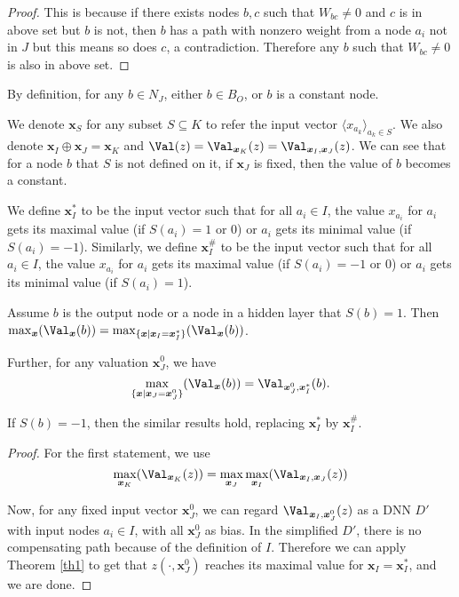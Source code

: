 				\begin{proof}
					This is because if there exists nodes $b,c$ such that $W_{bc}\neq 0$ and $c$ is in above set but $b$ is not, then $b$ has a path with nonzero weight from a node $a_i$ not in $J$ but this means so does $c$, a contradiction. Therefore any $b$ such that $W_{bc}\neq 0$ is also in above set.
				\end{proof}
				
				By definition, for any $b\in N_J$, either $b\in B_O$, or $b$ is a constant node.
				
				We denote $\boldsymbol{x}_S$ for any subset $S\subseteq K$ to refer the input vector $\langle x_{a_k}\rangle_{a_k\in S}$. We also denote $\boldsymbol{x}_I\oplus \boldsymbol{x}_J = \boldsymbol{x}_K$ and $\Val(z)=\Val_{\boldsymbol{x}_K}(z)=\Val_{\boldsymbol{x}_I,\boldsymbol{x}_J} (z)$. We can see that for a node $b$ that $S$ is not defined on it, if $\boldsymbol{x}_J$ is fixed, then the value of $b$ becomes a constant.
				
				We define $\boldsymbol{x}_I^*$ to be the input vector such that for all $a_i \in I$, the value $x_{a_i}$ for $a_i$ gets its maximal value (if $S(a_i)=1$ or $0$) or $a_i$ gets its minimal value (if $S(a_i)=-1$). Similarly, we define $\boldsymbol{x}_I^\#$ to be the input vector such that for all $a_i \in I$, the value $x_{a_i}$ for $a_i$ gets its maximal value (if $S(a_i)=-1$ or $0$) or $a_i$ gets its minimal value (if $S(a_i)=1$).
				
				
				
				\begin{lemma} \label{lem:reach_max_2}
					
					Assume $b$ is the output node or a node in a hidden layer that $S(b)=1$. Then
					$\max_{\boldsymbol{x}} (\Val_{\boldsymbol{x}}(b)) =\max_{\{\boldsymbol{x} \mid \boldsymbol{x}_I=\boldsymbol{x}^*_I\}} (\Val_{\boldsymbol{x}}(b))$.
					
					Further,  for any valuation $\boldsymbol{x}^0_J$, 
					we have $$\max_{\{\boldsymbol{x} \mid \boldsymbol{x}_J=\boldsymbol{x}^0_J\}} (\Val_{\boldsymbol{x}}(b)) =  \Val_{\boldsymbol{x}^0_J,\boldsymbol{x}_I^*}(b).$$
					
					If $S(b)=-1$, then the similar results hold, replacing $\boldsymbol{x}^*_I$ by $\boldsymbol{x}^\#_I$. 
				\end{lemma}
				
				\begin{proof}
					For the first statement, we use 
					$$\max_{\boldsymbol{x}_K} (\Val_{\boldsymbol{x}_K}(z)) =\max_{\boldsymbol{x}_J} \max_{\boldsymbol{x}_I} (\Val_{\boldsymbol{x}_I,\boldsymbol{x}_J}(z))$$
					
					Now, for any fixed input vector $\boldsymbol{x}^0_J$, we can regard $\Val_{\boldsymbol{x}_I,\boldsymbol{x}^0_J}(z)$ as a DNN $D'$ with input nodes $a_i\in I$, with all $\boldsymbol{x}^0_J$ %
					as bias. In the simplified $D'$, there is no compensating path because of the definition of $I$. Therefore we can apply Theorem \ref{th1} to get that $z(\cdot,\boldsymbol{x}^0_J)$ reaches its maximal value for $\boldsymbol{x}_I=\boldsymbol{x}_I^*$, and we are done.
				\end{proof}
				
